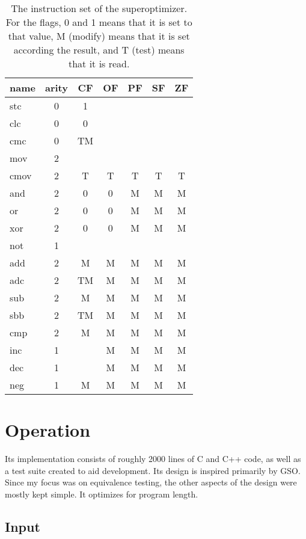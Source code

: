\documentclass[a4paper,11pt]{kth-mag}
\begin{document}
\begin{table}
\centering
\begin{tabular}{lc|ccccc}
name & arity & CF & OF & PF & SF & ZF \\
\hline
stc  & 0     & 1  &    &    &    &    \\
clc  & 0     & 0  &    &    &    &    \\
cmc  & 0     & TM &    &    &    &    \\
mov  & 2     &    &    &    &    &    \\
cmov & 2     & T  & T  & T  & T  & T  \\
and  & 2     & 0  & 0  & M  & M  & M  \\
or   & 2     & 0  & 0  & M  & M  & M  \\
xor  & 2     & 0  & 0  & M  & M  & M  \\
not  & 1     &    &    &    &    &    \\
add  & 2     & M  & M  & M  & M  & M  \\
adc  & 2     & TM & M  & M  & M  & M  \\
sub  & 2     & M  & M  & M  & M  & M  \\
sbb  & 2     & TM & M  & M  & M  & M  \\
cmp  & 2     & M  & M  & M  & M  & M  \\
inc  & 1     &    & M  & M  & M  & M  \\
dec  & 1     &    & M  & M  & M  & M  \\
neg  & 1     & M  & M  & M  & M  & M  \\
\end{tabular}
\caption{The instruction set of the superoptimizer.
For the flags, 0 and 1 means that it is set to that value, M (modify) means that it is set according the result, and T (test) means that it is read.}
\label{tab:insns}
\end{table}

\chapter{Operation}
\label{ch:operation}

Its implementation consists of roughly 2000 lines of C and C++ code, as well as a test suite created to aid development.
Its design is inspired primarily by GSO.
Since my focus was on equivalence testing, the other aspects of the design were mostly kept simple.
It optimizes for program length.

\section{Input}
\end{document}
